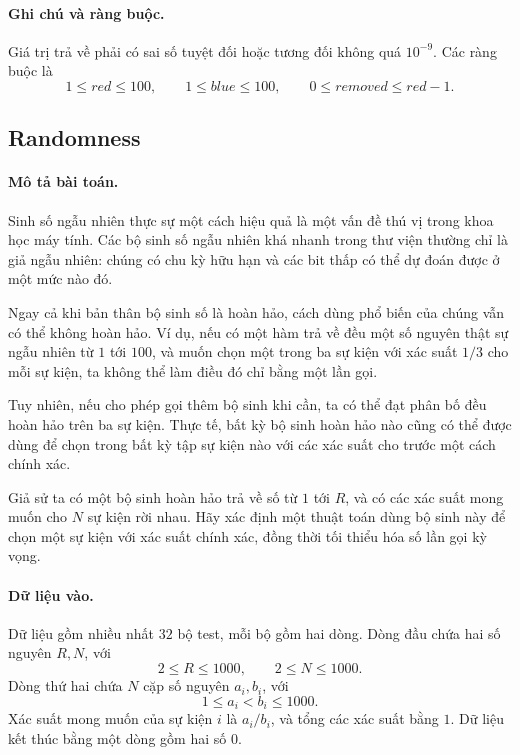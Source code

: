 \documentclass[11pt]{article}
\begin{document}
\paragraph{Ghi chú và ràng buộc.}
Giá trị trả về phải có sai số tuyệt đối hoặc tương đối không quá \(10^{-9}\).
Các ràng buộc là
\[
  1\le \mathit{red}\le 100,\qquad
  1\le \mathit{blue}\le 100,\qquad
  0\le \mathit{removed}\le \mathit{red}-1.
\]

\subsection*{Randomness}

\paragraph{Mô tả bài toán.}
Sinh số ngẫu nhiên thực sự một cách hiệu quả là một vấn đề thú vị trong khoa
học máy tính. Các bộ sinh số ngẫu nhiên khá nhanh trong thư viện thường chỉ là
giả ngẫu nhiên: chúng có chu kỳ hữu hạn và các bit thấp có thể dự đoán được ở
một mức nào đó.

Ngay cả khi bản thân bộ sinh số là hoàn hảo, cách dùng phổ biến của chúng vẫn
có thể không hoàn hảo. Ví dụ, nếu có một hàm trả về đều một số nguyên thật sự
ngẫu nhiên từ \(1\) tới \(100\), và muốn chọn một trong ba sự kiện với xác
suất \(1/3\) cho mỗi sự kiện, ta không thể làm điều đó chỉ bằng một lần gọi.

Tuy nhiên, nếu cho phép gọi thêm bộ sinh khi cần, ta có thể đạt phân bố đều
hoàn hảo trên ba sự kiện. Thực tế, bất kỳ bộ sinh hoàn hảo nào cũng có thể
được dùng để chọn trong bất kỳ tập sự kiện nào với các xác suất cho trước một
cách chính xác.

Giả sử ta có một bộ sinh hoàn hảo trả về số từ \(1\) tới \(R\), và có các xác
suất mong muốn cho \(N\) sự kiện rời nhau. Hãy xác định một thuật toán dùng bộ
sinh này để chọn một sự kiện với xác suất chính xác, đồng thời tối thiểu hóa
số lần gọi kỳ vọng.

\paragraph{Dữ liệu vào.}
Dữ liệu gồm nhiều nhất \(32\) bộ test, mỗi bộ gồm hai dòng. Dòng đầu chứa hai
số nguyên \(R,N\), với
\[
  2\le R\le 1000,\qquad 2\le N\le 1000.
\]
Dòng thứ hai chứa \(N\) cặp số nguyên \(a_i,b_i\), với
\[
  1\le a_i<b_i\le 1000.
\]
Xác suất mong muốn của sự kiện \(i\) là \(a_i/b_i\), và tổng các xác suất bằng
\(1\). Dữ liệu kết thúc bằng một dòng gồm hai số \(0\).
\end{document}
